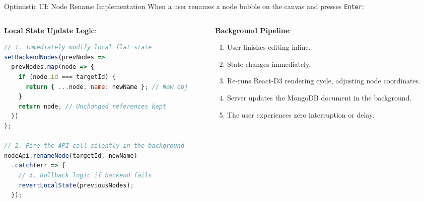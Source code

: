 \documentclass[aspectratio=169, 10pt]{beamer}
\begin{document}
\begin{frame}[fragile]{Optimistic UI: Node Rename Implementation}
  When a user renames a node bubble on the canvas and presses \texttt{Enter}:
  \vspace{0.2em}
  \begin{columns}
    \begin{column}{0.55\textwidth}
      \textbf{Local State Update Logic}:
      \begin{lstlisting}[language=javascript]
// 1. Immediately modify local flat state
setBackendNodes(prevNodes => 
  prevNodes.map(node => {
    if (node.id === targetId) {
      return { ...node, name: newName }; // New obj
    }
    return node; // Unchanged references kept
  })
);

// 2. Fire the API call silently in the background
nodeApi.renameNode(targetId, newName)
  .catch(err => {
    // 3. Rollback logic if backend fails
    revertLocalState(previousNodes);
  });
      \end{lstlisting}
    \end{column}
    \begin{column}{0.45\textwidth}
      \textbf{Background Pipeline}:
      \begin{enumerate}
        \item User finishes editing inline.
        \item State changes immediately.
        \item Re-runs React-D3 rendering cycle, adjusting node coordinates.
        \item Server updates the MongoDB document in the background.
        \item The user experiences zero interruption or delay.
      \end{enumerate}
    \end{column}
  \end{columns}
\end{frame}
\end{document}
